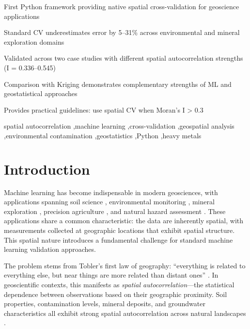 \documentclass[a4paper,fleqn]{cas-sc}
\begin{document}
\begin{highlights}
\item First Python framework providing native spatial cross-validation for geoscience applications
\item Standard CV underestimates error by 5--31\% across environmental and mineral exploration domains
\item Validated across two case studies with different spatial autocorrelation strengths (I = 0.336--0.545)
\item Comparison with Kriging demonstrates complementary strengths of ML and geostatistical approaches
\item Provides practical guidelines: use spatial CV when Moran's I > 0.3
\end{highlights}

\begin{keywords}
spatial autocorrelation \sep machine learning \sep cross-validation \sep geospatial analysis \sep environmental contamination \sep geostatistics \sep Python \sep heavy metals
\end{keywords}

\maketitle

\printcredits

\doublespacing


\section{Introduction}
\label{sec:intro}

Machine learning has become indispensable in modern geosciences, with applications spanning soil science \citep{hengl2018random}, environmental monitoring \citep{rodriguez2018machine}, mineral exploration \citep{zuo2019machine}, precision agriculture \citep{liakos2018machine}, and natural hazard assessment \citep{reichenbach2018review}. These applications share a common characteristic: the data are inherently spatial, with measurements collected at geographic locations that exhibit spatial structure. This spatial nature introduces a fundamental challenge for standard machine learning validation approaches.

The problem stems from Tobler's first law of geography: ``everything is related to everything else, but near things are more related than distant ones'' \citep{tobler1970computer}. In geoscientific contexts, this manifests as \textit{spatial autocorrelation}---the statistical dependence between observations based on their geographic proximity. Soil properties, contamination levels, mineral deposits, and groundwater characteristics all exhibit strong spatial autocorrelation across natural landscapes \citep{goovaerts1997geostatistics, webster2007geostatistics}.
\end{document}
